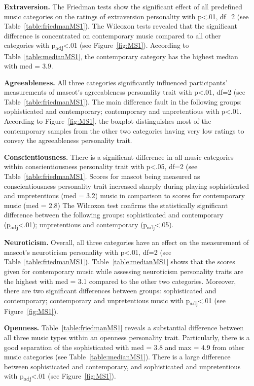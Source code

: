 \par\textbf{Extraversion.}
The Friedman tests show the significant effect of all predefined music categories on the
ratings of extraversion personality with p<.01, df=2 (see Table~\ref{table:friedmanMS1}).
The Wilcoxon tests revealed that the significant difference is concentrated on contemporary music
compared to all other categories with p\textsubscript{adj}<.01 (see Figure~\ref{fig:MS1}).
According to Table~\ref{table:medianMS1}, the contemporary category has the highest median with med = 3.9.

\par\textbf{Agreeableness.}
All three categories significantly influenced participants' measurements of mascot's
agreeableness personality trait with p<.01, df=2 (see Table~\ref{table:friedmanMS1}).
The main difference fault in the following groups: sophisticated and contemporary;
contemporary and unpretentious with p<.01.
According to Figure~\ref{fig:MS1}, the boxplot distinguishes most of the contemporary samples from
the other two categories having very low ratings to convey the agreeableness personality trait.

\par\textbf{Conscientiousness.}
There is a significant difference in all music categories within conscientiousness
personality trait with p<.05, df=2 (see Table~\ref{table:friedmanMS1}.
Scores for mascot being measured as conscientiousness personality trait increased sharply during playing
sophisticated and unpretentious (med = 3.2) music in comparison to scores for contemporary music (med = 2.8)
The Wilcoxon test confirms the statistically significant difference between the following groups:
sophisticated and contemporary (p\textsubscript{adj}<.01); unpretentious and contemporary (p\textsubscript{adj}<.05).

\par\textbf{Neuroticism.}
Overall, all three categories have an effect on the measurement of mascot's neuroticism
personality with p<.01, df=2 (see Table~\ref{table:friedmanMS1}).
Table~\ref{table:medianMS1} shows that the scores given for contemporary music while assessing
neuroticism personality traits are the highest with med = 3.1 compared to the other two categories.
Moreover, there are two significant differences between groups: sophisticated and contemporary;
contemporary and unpretentious music with p\textsubscript{adj}<.01 (see Figure~\ref{fig:MS1}).

\par\textbf{Openness.}
Table~\ref{table:friedmanMS1} reveals a substantial difference between all three music types
within an openness personality trait.
Particularly, there is a good separation of the sophisticated with med = 3.8 and max = 4.9
from other music categories (see Table~\ref{table:medianMS1}).
There is a large difference between sophisticated and contemporary, and sophisticated
and unpretentious with p\textsubscript{adj}<.01 (see Figure~\ref{fig:MS1}).

